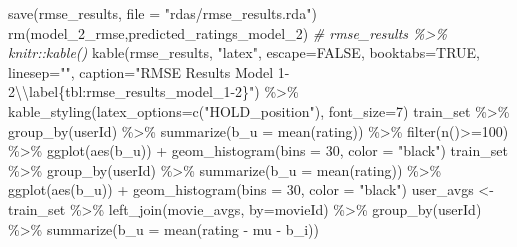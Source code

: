 \documentclass[
]{article}
\newenvironment{Shaded}{}{}
\newcommand{\AttributeTok}[1]{\textcolor[rgb]{0.49,0.56,0.16}{#1}}
\newcommand{\CommentTok}[1]{\textcolor[rgb]{0.38,0.63,0.69}{\textit{#1}}}
\newcommand{\ConstantTok}[1]{\textcolor[rgb]{0.53,0.00,0.00}{#1}}
\newcommand{\DecValTok}[1]{\textcolor[rgb]{0.25,0.63,0.44}{#1}}
\newcommand{\FunctionTok}[1]{\textcolor[rgb]{0.02,0.16,0.49}{#1}}
\newcommand{\NormalTok}[1]{#1}
\newcommand{\OtherTok}[1]{\textcolor[rgb]{0.00,0.44,0.13}{#1}}
\newcommand{\SpecialCharTok}[1]{\textcolor[rgb]{0.25,0.44,0.63}{#1}}
\newcommand{\StringTok}[1]{\textcolor[rgb]{0.25,0.44,0.63}{#1}}
\begin{document}
\begin{Shaded}
\begin{Highlighting}[]
\FunctionTok{save}\NormalTok{(rmse\_results, }\AttributeTok{file =} \StringTok{"rdas/rmse\_results.rda"}\NormalTok{)}
\FunctionTok{rm}\NormalTok{(model\_2\_rmse,predicted\_ratings\_model\_2)}
\CommentTok{\# rmse\_results \%\textgreater{}\% knitr::kable()}
  \FunctionTok{kable}\NormalTok{(rmse\_results, }\StringTok{"latex"}\NormalTok{, }\AttributeTok{escape=}\ConstantTok{FALSE}\NormalTok{, }\AttributeTok{booktabs=}\ConstantTok{TRUE}\NormalTok{, }\AttributeTok{linesep=}\StringTok{""}\NormalTok{, }\AttributeTok{caption=}\StringTok{"RMSE Results Model 1{-}2}\SpecialCharTok{\textbackslash{}\textbackslash{}}\StringTok{label\{tbl:rmse\_results\_model\_1{-}2\}"}\NormalTok{) }\SpecialCharTok{\%\textgreater{}\%}
    \FunctionTok{kable\_styling}\NormalTok{(}\AttributeTok{latex\_options=}\FunctionTok{c}\NormalTok{(}\StringTok{"HOLD\_position"}\NormalTok{), }\AttributeTok{font\_size=}\DecValTok{7}\NormalTok{)}
\NormalTok{train\_set }\SpecialCharTok{\%\textgreater{}\%} 
  \FunctionTok{group\_by}\NormalTok{(userId) }\SpecialCharTok{\%\textgreater{}\%} 
  \FunctionTok{summarize}\NormalTok{(}\AttributeTok{b\_u =} \FunctionTok{mean}\NormalTok{(rating)) }\SpecialCharTok{\%\textgreater{}\%} 
  \FunctionTok{filter}\NormalTok{(}\FunctionTok{n}\NormalTok{()}\SpecialCharTok{\textgreater{}=}\DecValTok{100}\NormalTok{) }\SpecialCharTok{\%\textgreater{}\%}
  \FunctionTok{ggplot}\NormalTok{(}\FunctionTok{aes}\NormalTok{(b\_u)) }\SpecialCharTok{+} 
  \FunctionTok{geom\_histogram}\NormalTok{(}\AttributeTok{bins =} \DecValTok{30}\NormalTok{, }\AttributeTok{color =} \StringTok{"black"}\NormalTok{)}
\NormalTok{train\_set }\SpecialCharTok{\%\textgreater{}\%} 
  \FunctionTok{group\_by}\NormalTok{(userId) }\SpecialCharTok{\%\textgreater{}\%} 
  \FunctionTok{summarize}\NormalTok{(}\AttributeTok{b\_u =} \FunctionTok{mean}\NormalTok{(rating)) }\SpecialCharTok{\%\textgreater{}\%} 
  \FunctionTok{ggplot}\NormalTok{(}\FunctionTok{aes}\NormalTok{(b\_u)) }\SpecialCharTok{+} 
  \FunctionTok{geom\_histogram}\NormalTok{(}\AttributeTok{bins =} \DecValTok{30}\NormalTok{, }\AttributeTok{color =} \StringTok{"black"}\NormalTok{)}
\NormalTok{user\_avgs }\OtherTok{\textless{}{-}}\NormalTok{ train\_set }\SpecialCharTok{\%\textgreater{}\%} 
  \FunctionTok{left\_join}\NormalTok{(movie\_avgs, }\AttributeTok{by=}\StringTok{\textquotesingle{}movieId\textquotesingle{}}\NormalTok{) }\SpecialCharTok{\%\textgreater{}\%}
  \FunctionTok{group\_by}\NormalTok{(userId) }\SpecialCharTok{\%\textgreater{}\%}
  \FunctionTok{summarize}\NormalTok{(}\AttributeTok{b\_u =} \FunctionTok{mean}\NormalTok{(rating }\SpecialCharTok{{-}}\NormalTok{ mu }\SpecialCharTok{{-}}\NormalTok{ b\_i))}


\end{Highlighting}
\end{Shaded}
\end{document}
